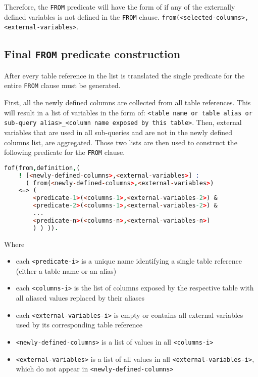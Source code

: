 \documentclass[magisterska,en]{pracamgr}
\newcommand{\code}[1]{\texttt{#1}}
\begin{document}
Therefore, the \code{FROM} predicate will have the form of if any of the externally defined variables is not defined in the \code{FROM} clause. \code{from(<selected-columns>,<external-variables>}.

\subsection{Final \code{FROM} predicate construction}

After every table reference in the list is translated the single predicate for the entire \code{FROM} clause must be generated.

First, all the newly defined columns are collected from all table references. This will result in a list of variables in the form of: \code{<table name or table alias or sub-query alias>_<column name exposed by this table>}. Then, external variables that are used in all sub-queries and are not in the newly defined columns list, are aggregated. Those two lists are then used to construct the following predicate for the \code{FROM} clause.

\begin{lstlisting}[language=Prolog]
fof(from,definition,(
    ! [<newly-defined-columns>,<external-variables>] :
      ( from(<newly-defined-columns>,<external-variables>)
    <=> (
        <predicate-1>(<columns-1>,<external-variables-2>) &
        <predicate-2>(<columns-1>,<external-variables-2>) &
        ...
        <predicate-n>(<columns-n>,<external-variables-n>)
        ) ) )).
\end{lstlisting}

Where
\begin{itemize}
    \item each \code{<predicate-i>} is a unique name identifying a single table reference (either a table name or an alias)
    \item each \code{<columns-i>} is the list of columns exposed by the respective table with all aliased values replaced by their aliases
    \item each \code{<external-variables-i>} is empty or contains all external variables used by its corresponding table reference
    \item \code{<newly-defined-columns>} is a list of values in all \code{<columns-i>}
    \item \code{<external-variables>} is a list of all values in all \code{<external-variables-i>}, which do not appear in \code{<newly-defined-columns>}
\end{itemize}
\end{document}
